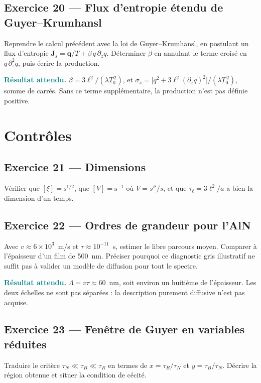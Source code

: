 \documentclass[11pt,a4paper]{article}
\newcommand{\rep}[1]{\par\smallskip\noindent\textcolor{teal}{\textbf{Résultat attendu.}}\; #1\par\smallskip}
\begin{document}
\subsection*{Exercice 20 --- Flux d'entropie étendu de Guyer--Krumhansl}

Reprendre le calcul précédent avec la loi de Guyer--Krumhansl, en postulant un flux d'entropie
$\mathbf{J}_s = \mathbf{q}/T + \beta\,q\,\partial_z q$. Déterminer $\beta$ en annulant le terme
croisé en $q\,\partial_z^2 q$, puis écrire la production.

\rep{$\beta = 3\ell^2/(\lambda T_0^{\,2})$, et
$\sigma_s = \bigl[q^2 + 3\ell^2(\partial_z q)^2\bigr]/(\lambda T_0^{\,2})$, somme de carrés. Sans ce
terme supplémentaire, la production n'est pas définie positive.}

\section{Contrôles}

\subsection*{Exercice 21 --- Dimensions}

Vérifier que $[\xi] = \mathrm{s}^{1/2}$, que $[V] = \mathrm{s}^{-1}$ où $V = s''/s$, et que
$\tau_\ell = 3\ell^2/a$ a bien la dimension d'un temps.

\subsection*{Exercice 22 --- Ordres de grandeur pour l'AlN}

Avec $v \approx 6\times10^3$~m/s et $\tau \approx 10^{-11}$~s, estimer le libre parcours moyen.
Comparer à l'épaisseur d'un film de 500~nm. Préciser pourquoi ce diagnostic gris illustratif ne suffit pas à valider un modèle de diffusion pour tout le spectre.

\rep{$\Lambda = v\tau \approx 60$~nm, soit environ un huitième de l'épaisseur. Les deux échelles ne
sont pas séparées : la description purement diffusive n'est pas acquise.}

\subsection*{Exercice 23 --- Fenêtre de Guyer en variables réduites}

Traduire le critère $\tau_N \ll \tau_B \ll \tau_R$ en termes de $x = \tau_R/\tau_N$ et
$y = \tau_B/\tau_N$. Décrire la région obtenue et situer la condition de cécité.
\end{document}
